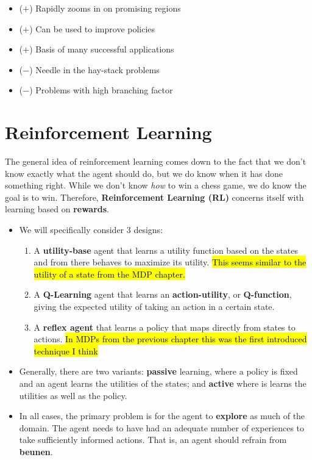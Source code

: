 \documentclass[
]{book}
\providecommand{\tightlist}{%
  \setlength{\itemsep}{0pt}\setlength{\parskip}{0pt}}
\begin{document}
\begin{itemize}
  \begin{itemize}
  \tightlist
  \item
    (\(+\)) Rapidly zooms in on promising regions
  \item
    (\(+\)) Can be used to improve policies
  \item
    (\(+\)) Basis of many successful applications
  \item
    (\(-\)) Needle in the hay-stack problems
  \item
    (\(-\)) Problems with high branching factor
  \end{itemize}
\end{itemize}

\hypertarget{reinforcement-learning}{%
\chapter{Reinforcement Learning}\label{reinforcement-learning}}

The general idea of reinforcement learning comes down to the fact that
we don't know exactly what the agent should do, but we do know when it
has done something right. While we don't know \emph{how} to win a chess
game, we do know the goal is to win. Therefore, \textbf{Reinforcement
Learning (RL)} concerns itself with learning based on \textbf{rewards}.

\begin{itemize}
\item
  We will specifically consider 3 designs:

  \begin{enumerate}
  \def\labelenumi{\arabic{enumi}.}
  \item
    A \textbf{utility-base} agent that learns a utility function based
    on the states and from there behaves to maximize its utility.
    \hl{This seems similar to the utility of a state from the MDP
    chapter.}
  \item
    A \textbf{Q-Learning} agent that learns an \textbf{action-utility},
    or \textbf{Q-function}, giving the expected utility of taking an
    action in a certain state.
  \item
    A \textbf{reflex agent} that learns a policy that maps directly from
    states to actions. \hl{In MDPs from the previous chapter this was
    the first introduced technique I think}
  \end{enumerate}
\item
  Generally, there are two variants: \textbf{passive} learning, where a
  policy is fixed and an agent learns the utilities of the states; and
  \textbf{active} where is learns the utilities as well as the policy.
\item
  In all cases, the primary problem is for the agent to \textbf{explore}
  as much of the domain. The agent needs to have had an adequate number
  of experiences to take sufficiently informed actions. That is, an
  agent should refrain from \textbf{beunen}.
\end{itemize}
\end{document}
